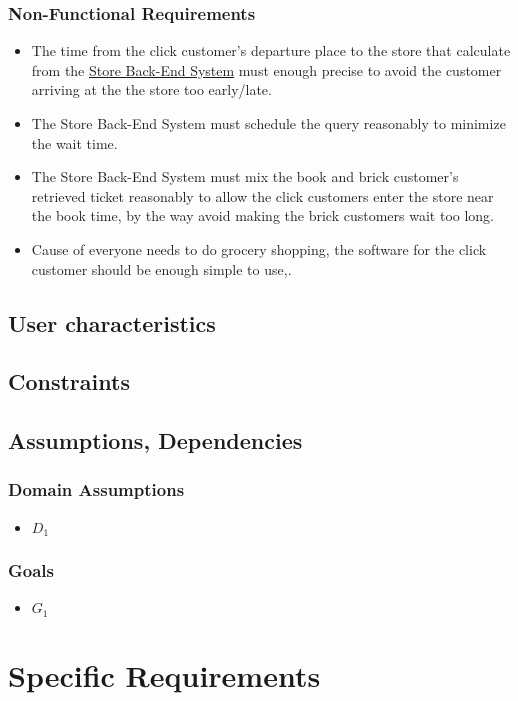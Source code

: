 \documentclass[a4paper,12pt]{book}
\begin{document}
\subsection{Non-Functional Requirements}
\begin{itemize}
	\item The time from the click customer's departure place to the store that calculate from the \hyperref[Definitions]{Store Back-End System} must enough precise to avoid the customer arriving at the the store too early/late.
	\item The Store Back-End System must schedule the query reasonably to minimize the wait time.
	\item The Store Back-End System must mix the book and brick customer's retrieved ticket reasonably to allow the click customers enter the store near the book time, by the way avoid making the brick customers wait too long.
	\item Cause of everyone needs to do grocery shopping, the software for the click customer should be enough simple to use,.
\end{itemize}

\section{User characteristics}
\section{Constraints}
\section{Assumptions, Dependencies}
\subsection{Domain Assumptions}
\begin{itemize}
	\item $D_1$
\end{itemize}

\subsection{Goals}
\begin{itemize}
	\item $G_1$
\end{itemize}



\chapter{Specific Requirements} \label{C3:SpecificRequirements}
\end{document}
